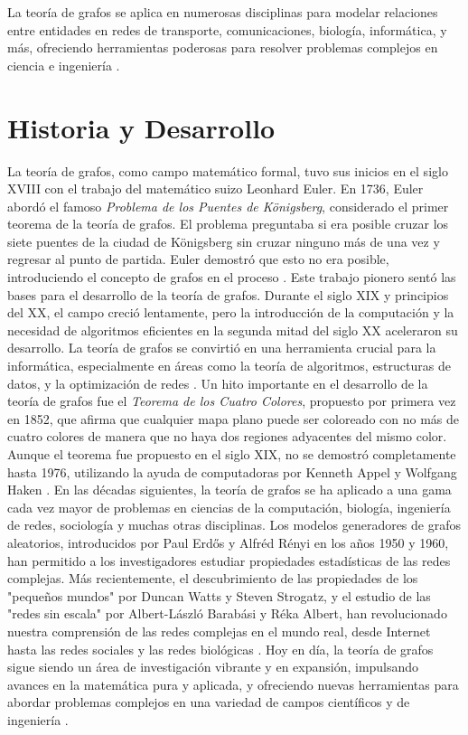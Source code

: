 La teoría de grafos se aplica en numerosas disciplinas para modelar relaciones entre entidades en redes de transporte, comunicaciones, biología, informática, y más, ofreciendo herramientas poderosas para resolver problemas complejos en ciencia e ingeniería \citep{West2000, Gross2004, Castillo2005} .

\section{Historia y Desarrollo}

La teoría de grafos, como campo matemático formal, tuvo sus inicios en el siglo XVIII con el trabajo del matemático suizo Leonhard Euler. En 1736, Euler abordó el famoso \textit{Problema de los Puentes de Königsberg}, considerado el primer teorema de la teoría de grafos. El problema preguntaba si era posible cruzar los siete puentes de la ciudad de Königsberg sin cruzar ninguno más de una vez y regresar al punto de partida. Euler demostró que esto no era posible, introduciendo el concepto de grafos en el proceso \citep{Wilson2008}.
Este trabajo pionero sentó las bases para el desarrollo de la teoría de grafos. Durante el siglo XIX y principios del XX, el campo creció lentamente, pero la introducción de la computación y la necesidad de algoritmos eficientes en la segunda mitad del siglo XX aceleraron su desarrollo. La teoría de grafos se convirtió en una herramienta crucial para la informática, especialmente en áreas como la teoría de algoritmos, estructuras de datos, y la optimización de redes .
Un hito importante en el desarrollo de la teoría de grafos fue el \textit{Teorema de los Cuatro Colores}, propuesto por primera vez en 1852, que afirma que cualquier mapa plano puede ser coloreado con no más de cuatro colores de manera que no haya dos regiones adyacentes del mismo color. Aunque el teorema fue propuesto en el siglo XIX, no se demostró completamente hasta 1976, utilizando la ayuda de computadoras por Kenneth Appel y Wolfgang Haken \citep{Wilson2008} .
En las décadas siguientes, la teoría de grafos se ha aplicado a una gama cada vez mayor de problemas en ciencias de la computación, biología, ingeniería de redes, sociología y muchas otras disciplinas. Los modelos generadores de grafos aleatorios, introducidos por Paul Erdős y Alfréd Rényi en los años 1950 y 1960, han permitido a los investigadores estudiar propiedades estadísticas de las redes complejas. Más recientemente, el descubrimiento de las propiedades de los "pequeños mundos" por Duncan Watts y Steven Strogatz, y el estudio de las "redes sin escala" por Albert-László Barabási y Réka Albert, han revolucionado nuestra comprensión de las redes complejas en el mundo real, desde Internet hasta las redes sociales y las redes biológicas \citep{Newman2010, Bollobas2001, Caldarelli2007} .
Hoy en día, la teoría de grafos sigue siendo un área de investigación vibrante y en expansión, impulsando avances en la matemática pura y aplicada, y ofreciendo nuevas herramientas para abordar problemas complejos en una variedad de campos científicos y de ingeniería \citep{West2000, Gross2004, Castillo2005} .

